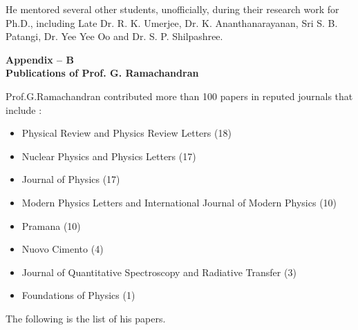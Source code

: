 He mentored several other students, unofficially, during their research work for Ph.D., including Late Dr. R. K. Umerjee, Dr. K. Ananthanarayanan, Sri S. B. Patangi, Dr. Yee Yee Oo and Dr. S. P. Shilpashree.

\begin{center}
\textbf{Appendix -- B}\\[4pt]
\textbf{Publications of Prof. G. Ramachandran}
\end{center}

Prof.G.Ramachandran contributed more than 100 papers in reputed journals that include :
\begin{itemize}
\item Physical Review and Physics Review Letters (18)
\item Nuclear Physics and Physics Letters (17)
\item Journal of Physics (17)
\item Modern Physics Letters and International Journal of Modern Physics (10) 
\item Pramana (10)
\item Nuovo Cimento (4)
\item Journal of Quantitative Spectroscopy and Radiative Transfer (3)
\item Foundations of Physics (1)
\end{itemize}

The following is the list of his papers.








